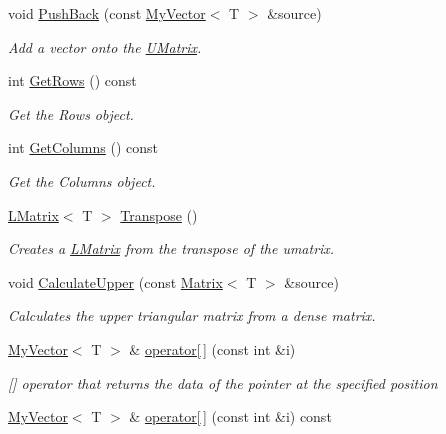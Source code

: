 \begin{DoxyCompactItemize}
void \mbox{\hyperlink{class_u_matrix_a57003b0a0f3fe394ab04f9588732a928}{Push\+Back}} (const \mbox{\hyperlink{class_my_vector}{My\+Vector}}$<$ T $>$ \&source)
\begin{DoxyCompactList}\small\item\em Add a vector onto the \mbox{\hyperlink{class_u_matrix}{U\+Matrix}}. \end{DoxyCompactList}\item 
int \mbox{\hyperlink{class_u_matrix_ae261286236cb23a0dfa1296591f4c3ad}{Get\+Rows}} () const
\begin{DoxyCompactList}\small\item\em Get the Rows object. \end{DoxyCompactList}\item 
int \mbox{\hyperlink{class_u_matrix_a4065961abb79fd43d7abaf10c47e73d8}{Get\+Columns}} () const
\begin{DoxyCompactList}\small\item\em Get the Columns object. \end{DoxyCompactList}\item 
\mbox{\hyperlink{class_l_matrix}{L\+Matrix}}$<$ T $>$ \mbox{\hyperlink{class_u_matrix_a7b8f7cc5acf42e18dcaabbc49533c6b8}{Transpose}} ()
\begin{DoxyCompactList}\small\item\em Creates a \mbox{\hyperlink{class_l_matrix}{L\+Matrix}} from the transpose of the umatrix. \end{DoxyCompactList}\item 
void \mbox{\hyperlink{class_u_matrix_a63af4ca40c18c71bd0609d4511779852}{Calculate\+Upper}} (const \mbox{\hyperlink{class_matrix}{Matrix}}$<$ T $>$ \&source)
\begin{DoxyCompactList}\small\item\em Calculates the upper triangular matrix from a dense matrix. \end{DoxyCompactList}\item 
\mbox{\hyperlink{class_my_vector}{My\+Vector}}$<$ T $>$ \& \mbox{\hyperlink{class_u_matrix_a0dea1e82fbf5ae67bec479c070b185dc}{operator\mbox{[}$\,$\mbox{]}}} (const int \&i)
\begin{DoxyCompactList}\small\item\em \mbox{[}\mbox{]} operator that returns the data of the pointer at the specified position \end{DoxyCompactList}\item 
\mbox{\hyperlink{class_my_vector}{My\+Vector}}$<$ T $>$ \& \mbox{\hyperlink{class_u_matrix_ab0ad5eda96c9a8bb9ca8c69d4bb8d5f8}{operator\mbox{[}$\,$\mbox{]}}} (const int \&i) const

\end{DoxyCompactItemize}

